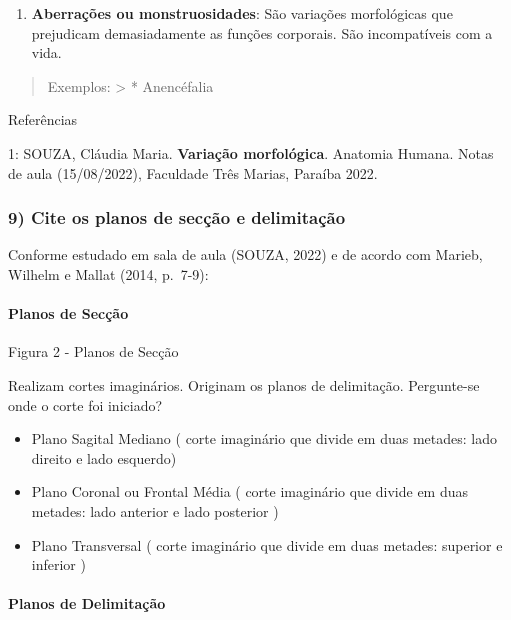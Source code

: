 \documentclass[
]{book}
\providecommand{\tightlist}{%
  \setlength{\itemsep}{0pt}\setlength{\parskip}{0pt}}
\begin{document}
\begin{enumerate}
\def\labelenumi{\arabic{enumi}.}
\setcounter{enumi}{2}
\tightlist
\item
  \textbf{Aberrações ou monstruosidades}: São variações morfológicas que prejudicam demasiadamente as funções corporais. São incompatíveis com a vida.
\end{enumerate}

\begin{quote}
Exemplos:
\textgreater{} * Anencéfalia
\end{quote}

Referências

1: SOUZA, Cláudia Maria. \textbf{Variação morfológica}. Anatomia Humana. Notas de aula (15/08/2022), Faculdade Três Marias, Paraíba 2022.

\hypertarget{cite-os-planos-de-secuxe7uxe3o-e-delimitauxe7uxe3o}{%
\subsubsection*{9) Cite os planos de secção e delimitação}\label{cite-os-planos-de-secuxe7uxe3o-e-delimitauxe7uxe3o}}

Conforme estudado em sala de aula (SOUZA, 2022) e de acordo com Marieb, Wilhelm e Mallat (2014, p.~7-9):

\hypertarget{planos-de-secuxe7uxe3o-1}{%
\paragraph{Planos de Secção}\label{planos-de-secuxe7uxe3o-1}}

Figura 2 - Planos de Secção

Realizam cortes imaginários. Originam os planos de delimitação. Pergunte-se onde o corte foi iniciado?

\begin{itemize}
\tightlist
\item
  Plano Sagital Mediano ( corte imaginário que divide em duas metades: lado direito e lado esquerdo)
\item
  Plano Coronal ou Frontal Média ( corte imaginário que divide em duas metades: lado anterior e lado posterior )
\item
  Plano Transversal ( corte imaginário que divide em duas metades: superior e inferior )
\end{itemize}

\hypertarget{planos-de-delimitauxe7uxe3o-1}{%
\paragraph{Planos de Delimitação}\label{planos-de-delimitauxe7uxe3o-1}}
\end{document}
